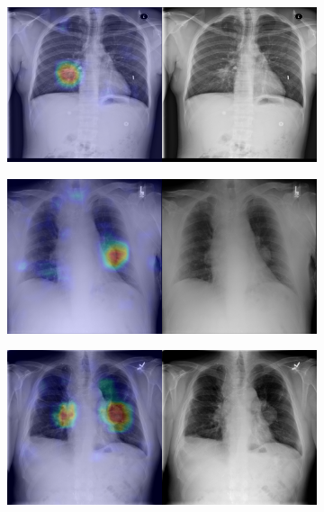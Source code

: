 \begin{figure}[b]
\begin{subfigure}{0.4\textwidth}
    \end{subfigure}
    \begin{subfigure}{0.4\textwidth}
        \centering
        \includegraphics[width=1.0\textwidth]{Chapters/5. Conclusiones/img/Mass/1_1_00001517_011.png}
    \end{subfigure}
    \begin{subfigure}{0.4\textwidth}
        \centering
        \includegraphics[width=1.0\textwidth]{Chapters/5. Conclusiones/img/Mass/1_1_00001900_011.png}
    \end{subfigure}
    \begin{subfigure}{0.4\textwidth}
        \centering
        \includegraphics[width=1.0\textwidth]{Chapters/5. Conclusiones/img/Mass/1_1_00001900_018.png}

\end{subfigure}
\end{figure}
